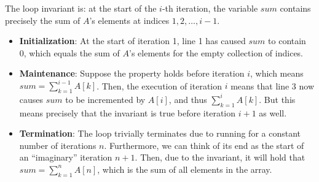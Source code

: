 \begin{solution}

    The loop invariant is: at the start of the $i$-th iteration, the variable $sum$ contains precisely the sum of $A$'s elements at indices $1, 2, \ldots, i - 1$.
    \begin{itemize}
        \item \textbf{Initialization}: At the start of iteration 1, line 1 has caused $sum$ to contain 0, which equals the sum of $A$'s elements for the empty collection of indices.
        \item \textbf{Maintenance}: Suppose the property holds before iteration $i$, which means $sum = \sum_{k=1}^{i - 1} A[k]$.
        Then, the execution of iteration $i$ means that line 3 now causes $sum$ to be incremented by $A[i]$, and thus $\sum_{k=1}^{i} A[k]$.
        But this means precisely that the invariant is true before iteration $i + 1$ as well.
        \item \textbf{Termination}: The loop trivially terminates due to running for a constant number of iterations $n$.
        Furthermore, we can think of its end as the start of an ``imaginary'' iteration $n + 1$.
        Then, due to the invariant, it will hold that $sum = \sum_{k=1}^{n} A[n]$, which is the sum of all elements in the array.
    \end{itemize}
\end{solution}
